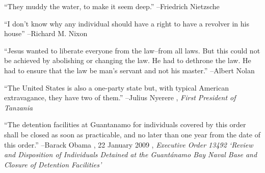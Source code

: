 \documentclass{article}%
\begin{document}
\linebreak%
\vspace{1mm}%
\begin{minipage}{\textwidth}%
\flushleft%
“They muddy the water, to make it seem deep.”%
\linebreak%
\vspace{1mm}%
–Friedrich Nietzsche%
\linebreak%
\vspace{1mm}%
\end{minipage}%
\linebreak%
\vspace{1mm}%
\begin{minipage}{\textwidth}%
\flushleft%
“I don't know why any individual should have a right to have a revolver in his house”%
\linebreak%
\vspace{1mm}%
–Richard M. Nixon%
\linebreak%
\vspace{1mm}%
\end{minipage}%
\linebreak%
\vspace{1mm}%
\begin{minipage}{\textwidth}%
\flushleft%
“Jesus wanted to liberate everyone from the law–from all laws. But this could not be achieved by abolishing or changing the law. He had to dethrone the law. He had to ensure that the law be man's servant and not his master.”%
\linebreak%
\vspace{1mm}%
–Albert Nolan%
\linebreak%
\vspace{1mm}%
\end{minipage}%
\linebreak%
\vspace{1mm}%
\begin{minipage}{\textwidth}%
\flushleft%
“The United States is also a one{-}party state but, with typical American extravagance, they have two of them.”%
\linebreak%
\vspace{1mm}%
–Julius Nyerere%
, \textit{First President of Tanzania}%
\linebreak%
\vspace{1mm}%
\end{minipage}%
\linebreak%
\vspace{1mm}%
\begin{minipage}{\textwidth}%
\flushleft%
“The detention facilities at Guantanamo for individuals covered by this order shall be closed as soon as practicable, and no later than one year from the date of this order.”%
\linebreak%
\vspace{1mm}%
–Barack Obama%
, 22 January 2009%
, \textit{Executive Order 13492 ‘Review and Disposition of Individuals Detained at the Guantánamo Bay Naval Base and Closure of Detention Facilities’}%
\linebreak%
\vspace{1mm}%
\end{minipage}%
\end{document}
